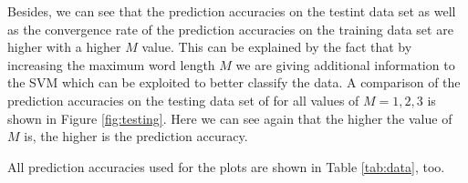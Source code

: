 \documentclass[a4paper, 12pt, titlepage]{article}
\begin{document}
Besides, we can see that the prediction accuracies on the testint data set as well as the convergence rate of the prediction accuracies on the training data set are higher with a higher $M$ value.
This can be explained by the fact that by increasing the maximum word length $M$ we are giving additional information to the SVM which can be exploited to better classify the data.
A comparison of the prediction accuracies on the testing data set of for all values of $M=1,2,3$ is shown in Figure \ref{fig:testing}.
Here we can see again that the higher the value of $M$ is, the higher is the prediction accuracy.

All prediction accuracies used for the plots are shown in Table \ref{tab:data}, too.


\begin{figure}
	\centering
	\\

\end{figure}
\end{document}
